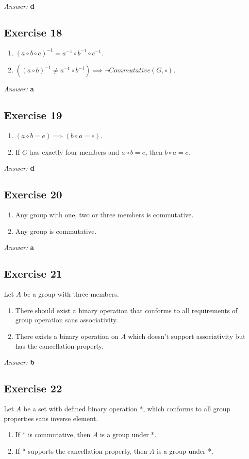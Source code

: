 \documentclass[11pt]{article}
\begin{document}
\emph{Answer:} \textbf{d}
\subsection{Exercise 18}
\label{sec-2-18}
\begin{enumerate}
\item $(a \circ b \circ c)^{-1} = a^{-1} \circ b^{-1} \circ c^{-1}$.
\item $((a \circ b)^{-1} \neq a^{-1} \circ b^{-1}) \implies \lnot Commutative(G, \circ)$.
\end{enumerate}

\emph{Answer:} \textbf{a}
\subsection{Exercise 19}
\label{sec-2-19}
\begin{enumerate}
\item $(a \circ b = e) \implies (b \circ a = e)$.
\item If $G$ has exactly four members and $a \circ b = c$, then $b \circ a = c$.
\end{enumerate}

\emph{Answer:} \textbf{d}
\subsection{Exercise 20}
\label{sec-2-20}
\begin{enumerate}
\item Any group with one, two or three members is commutative.
\item Any group is commutative.
\end{enumerate}

\emph{Answer:} \textbf{a}
\subsection{Exercise 21}
\label{sec-2-21}
Let $A$ be a group with three members.
\begin{enumerate}
\item There should exist a binary operation that conforms to all requirements of 
group operation sans associativity.
\item There exists a binary operation on $A$ which doesn't support associativity
but has the cancellation property.
\end{enumerate}

\emph{Answer:} \textbf{b}
\subsection{Exercise 22}
\label{sec-2-22}
Let $A$ be a set with defined binary operation *, which conforms to all
group properties sans inverse element.
\begin{enumerate}
\item If * is commutative, then $A$ is a group under *.
\item If * supports the cancellation property, then $A$ is a group under *.
\end{enumerate}
\end{document}
